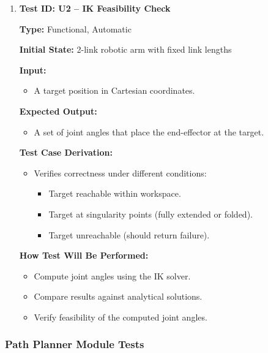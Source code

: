 \documentclass[12pt, titlepage]{article}
\begin{document}
\begin{enumerate}
\item \textbf{Test ID: U2 -- IK Feasibility Check}  

\textbf{Type:} Functional, Automatic  

\textbf{Initial State:} 2-link robotic arm with fixed link lengths  

\textbf{Input:}  
\begin{itemize}
    \item A target position in Cartesian coordinates.
\end{itemize}

\textbf{Expected Output:}  
\begin{itemize}
    \item A set of joint angles that place the end-effector at the target.
\end{itemize}

\textbf{Test Case Derivation:}  
\begin{itemize}
    \item Verifies correctness under different conditions:
    \begin{itemize}
        \item Target reachable within workspace.
        \item Target at singularity points (fully extended or folded).
        \item Target unreachable (should return failure).
    \end{itemize}
\end{itemize}

\textbf{How Test Will Be Performed:}  
\begin{itemize}
    \item Compute joint angles using the IK solver.
    \item Compare results against analytical solutions.
    \item Verify feasibility of the computed joint angles.
\end{itemize}

\end{enumerate}


\subsubsection{Path Planner Module Tests}
\end{document}
